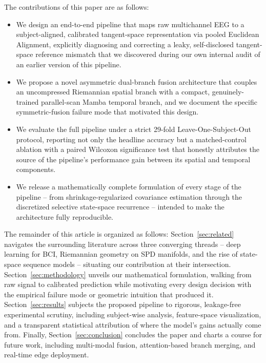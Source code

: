 \documentclass[journal]{IEEEtran}
\begin{document}
The contributions of this paper are as follows:
\begin{itemize}
    \item We design an end-to-end pipeline that maps raw multichannel EEG to a subject-aligned, calibrated tangent-space representation via pooled Euclidean Alignment, explicitly diagnosing and correcting a leaky, self-disclosed tangent-space reference mismatch that we discovered during our own internal audit of an earlier version of this pipeline.
    \item We propose a novel asymmetric dual-branch fusion architecture that couples an uncompressed Riemannian spatial branch with a compact, genuinely-trained parallel-scan Mamba temporal branch, and we document the specific symmetric-fusion failure mode that motivated this design.
    \item We evaluate the full pipeline under a strict 29-fold Leave-One-Subject-Out protocol, reporting not only the headline accuracy but a matched-control ablation with a paired Wilcoxon significance test that honestly attributes the source of the pipeline's performance gain between its spatial and temporal components.
    \item We release a mathematically complete formulation of every stage of the pipeline -- from shrinkage-regularized covariance estimation through the discretized selective state-space recurrence -- intended to make the architecture fully reproducible.
\end{itemize}

The remainder of this article is organized as follows: Section~\ref{sec:related} navigates the surrounding literature across three converging threads -- deep learning for BCI, Riemannian geometry on SPD manifolds, and the rise of state-space sequence models -- situating our contribution at their intersection. Section~\ref{sec:methodology} unveils our mathematical formulation, walking from raw signal to calibrated prediction while motivating every design decision with the empirical failure mode or geometric intuition that produced it. Section~\ref{sec:results} subjects the proposed pipeline to rigorous, leakage-free experimental scrutiny, including subject-wise analysis, feature-space visualization, and a transparent statistical attribution of where the model's gains actually come from. Finally, Section~\ref{sec:conclusion} concludes the paper and charts a course for future work, including multi-modal fusion, attention-based branch merging, and real-time edge deployment.
\end{document}
